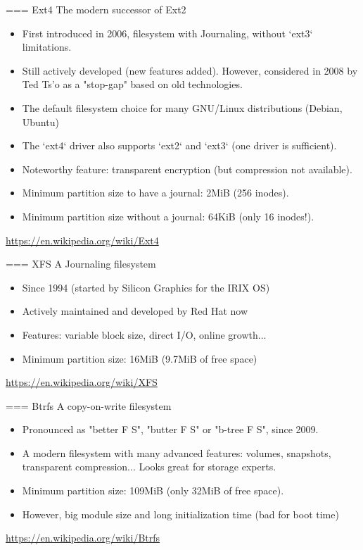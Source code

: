 === {Ext4}
    The modern successor of Ext2
    \begin{itemize}
        \item First introduced in 2006, filesystem with Journaling, without `ext3` limitations.
        \item Still actively developed (new features added). However, considered in 2008
              by Ted Ts'o as a "stop-gap" based on old technologies.
        \item The default filesystem choice for many GNU/Linux distributions (Debian, Ubuntu)
        \item The `ext4` driver also supports `ext2` and `ext3` (one driver is sufficient).
        \item Noteworthy feature: transparent encryption (but compression not available).
	\item Minimum partition size to have a journal: 2MiB (256 inodes).
        \item Minimum partition size without a journal: 64KiB (only 16 inodes!).
    \end{itemize}
    \url{https://en.wikipedia.org/wiki/Ext4}


=== {XFS}
    A Journaling filesystem
    \begin{itemize}
        \item Since 1994 (started by Silicon Graphics for the IRIX OS)
        \item Actively maintained and developed by Red Hat now
        \item Features: variable block size, direct I/O, online growth...
        \item Minimum partition size: 16MiB (9.7MiB of free space)
    \end{itemize}
    \url{https://en.wikipedia.org/wiki/XFS}


=== {Btrfs}
    A copy-on-write filesystem
    \begin{itemize}
        \item Pronounced as "better F S", "butter F S" or "b-tree F S", since 2009.
        \item A modern filesystem with many advanced features: volumes, snapshots, transparent compression...
			  Looks great for storage experts.
        \item Minimum partition size: 109MiB (only 32MiB of free space).
        \item However, big module size and long initialization time (bad for boot time)
    \end{itemize}
    \url{https://en.wikipedia.org/wiki/Btrfs}


